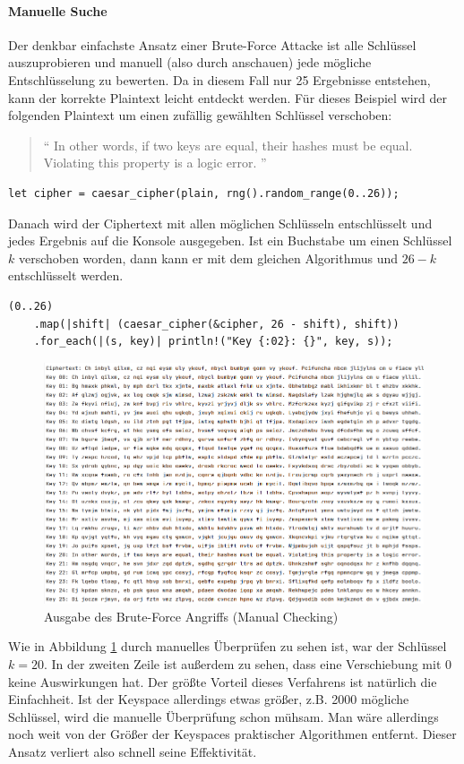 \documentclass{article}
\begin{document}
    \paragraph{Manuelle Suche}
    Der denkbar einfachste Ansatz einer Brute-Force Attacke ist alle Schlüssel auszuprobieren und
    manuell (also durch anschauen) jede mögliche Entschlüsselung zu bewerten.
    Da in diesem Fall nur 25 Ergebnisse entstehen, kann der korrekte Plaintext leicht entdeckt werden.
    Für dieses Beispiel wird der folgenden Plaintext um einen zufällig gewählten Schlüssel verschoben:
    \begin{quote}
        "` In other words, if two keys are equal, their hashes must be equal. Violating this property is a logic error. "'
    \end{quote}
    \begin{verbatim}
let cipher = caesar_cipher(plain, rng().random_range(0..26));
    \end{verbatim}
    Danach wird der Ciphertext mit allen möglichen Schlüsseln entschlüsselt und jedes Ergebnis auf die Konsole ausgegeben.
    Ist ein Buchstabe um einen Schlüssel $k$ verschoben worden, dann kann er mit dem gleichen Algorithmus
    und $26 - k$ entschlüsselt werden.
    \begin{verbatim}
(0..26)
    .map(|shift| (caesar_cipher(&cipher, 26 - shift), shift))
    .for_each(|(s, key)| println!("Key {:02}: {}", key, s));
    \end{verbatim}
    \begin{figure}
        \includegraphics[width=\textwidth]{text_results/console_out1.png}
        \caption{Ausgabe des Brute-Force Angriffs (Manual Checking)}
        \label{fig:console_manual_checking}
    \end{figure}
    Wie in Abbildung \ref{fig:console_manual_checking} durch manuelles Überprüfen zu sehen ist,
    war der Schlüssel $k=20$. In der zweiten Zeile ist außerdem zu sehen, dass
    eine Verschiebung mit 0 keine Auswirkungen hat. Der größte Vorteil dieses
    Verfahrens ist natürlich die Einfachheit. Ist der Keyspace allerdings etwas größer,
    z.B. 2000 mögliche Schlüssel, wird die manuelle Überprüfung schon mühsam. Man wäre
    allerdings noch weit von der Größer der Keyspaces praktischer Algorithmen entfernt.
    Dieser Ansatz verliert also schnell seine Effektivität.
\end{document}
